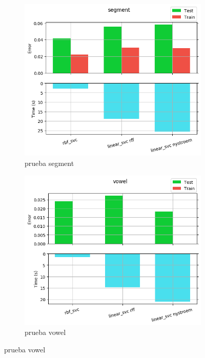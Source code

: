\begin{figure}[ht]
  \centering
  \begin{subfigure}[b]{0.5\linewidth}
    \centering\includegraphics[width=\imgscale\linewidth]{Figures/1_1/segment}
    \caption{prueba segment}
    \label{fig:1_1_segment}
  \end{subfigure}%
  \begin{subfigure}[b]{0.5\linewidth}
    \centering\includegraphics[width=\imgscale\linewidth]{Figures/1_1/vowel}
    \caption{prueba vowel}
    \label{fig:1_1_vowel}
  \end{subfigure}
\end{figure}
